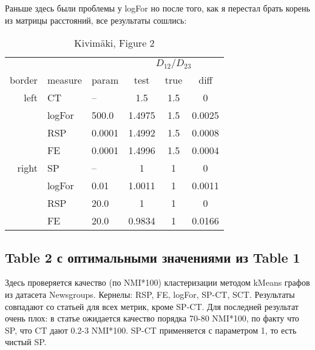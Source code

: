 \documentclass{article}
\begin{document}
Раньше здесь были проблемы у logFor но после того, как я перестал брать корень из матрицы расстояний, все результаты сошлись:

\begin{table}[H]
\centering
\caption{Kivim{\"a}ki, Figure 2}
\label{my-label}
\begin{tabular}{rll|cc|c}
       &         &        & \multicolumn{3}{c}{$D_{12} / D_{23}$} \\
border & measure & param  & test   & true & diff   \\
       \hline
left   & CT      & --     & 1.5    & 1.5  & 0      \\
       & logFor  & 500.0  & 1.4975 & 1.5  & 0.0025 \\
       & RSP     & 0.0001 & 1.4992 & 1.5  & 0.0008 \\
       & FE      & 0.0001 & 1.4996 & 1.5  & 0.0004 \\
       \hline
right  & SP      & --     & 1      & 1    & 0      \\
       & logFor  & 0.01   & 1.0011 & 1    & 0.0011 \\
       & RSP     & 20.0   & 1      & 1    & 0      \\
       & FE      & 20.0   & 0.9834 & 1    & 0.0166
\end{tabular}
\end{table}

\subsection{Table 2 с оптимальными значениями из Table 1}
Здесь проверяется качество (по NMI*100) кластеризации методом kMeans графов из датасета Newsgroups. Кернелы: RSP, FE, logFor, SP-CT, SCT. Результаты совпадают со статьей для всех метрик, кроме SP-CT. Для последней результат очень плох: в статье ожидается качество порядка 70-80 NMI*100, по факту что SP, что CT дают 0.2-3 NMI*100. SP-CT применяется с параметром 1, то есть чистый SP.
\end{document}
